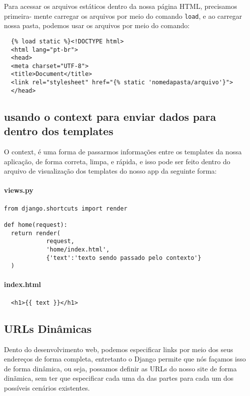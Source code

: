 \documentclass[12pt, a4paper]{paper}
\begin{document}
Para acessar os arquivos estáticos dentro da nossa página HTML, precisamos 
primeira- 
mente carregar os arquivos por meio do comando \texttt{load}, e ao carregar nossa pasta, 
podemos usar os arquivos por meio do comando:

\begin{verbatim}
  {% load static %}<!DOCTYPE html>
  <html lang="pt-br">
  <head>
  <meta charset="UTF-8">
  <title>Document</title>
  <link rel="stylesheet" href="{% static 'nomedapasta/arquivo'}">
  </head>
\end{verbatim}

\subsection{usando o context para enviar dados para dentro dos templates} %
\label{sub:usando o context para enviar dados para dentro dos templates}
O context, é uma forma de passarmos informações entre os templates da nossa aplicação, 
de forma correta, limpa, e rápida, e isso pode ser feito dentro do arquivo de 
visualização dos templates do nosso app da seguinte forma:


\paragraph{views.py} %
\label{par:views.py}
\begin{verbatim}
from django.shortcuts import render 

def home(request):
  return render(
            request,
            'home/index.html',
            {'text':'texto sendo passado pelo contexto'}
  )
\end{verbatim}


\paragraph{index.html} %
\label{par:index.html}
\begin{verbatim}
  <h1>{{ text }}</h1>
\end{verbatim}


\subsection{URLs Dinâmicas} %
\label{sub:URLs Dinâmicas}
Dento do desenvolvimento web, podemos especificar links por meio dos seus endereços 
de forma completa, entretanto o Django permite que nós façamos isso de forma dinâmica, 
ou seja, possamos definir as URLs do nosso site de forma dinãmica, sem ter que especificar
cada uma da das partes para cada um dos possíveis cenários existentes.
\end{document}

